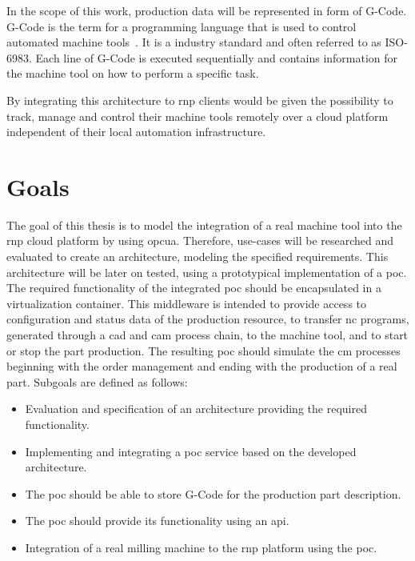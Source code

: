 \documentclass[
a4paper,
twoside,
headsepline,
cleardoublepage=empty,
parskip=half,
draft=false
]{scrbook}
\begin{document}
			In the scope of this work, production data will be represented in form of G-Code.
			G-Code is the term for a programming language that is used to control automated machine tools~\cite{shin2007reincarnation}. 
			It is a industry standard and often referred to as ISO-6983. 
			Each line of G-Code is executed sequentially and contains information for the machine tool on how to perform a specific task.
			
			By integrating this architecture to \gls{rnp} clients would be given the possibility to track, manage and control their machine tools remotely over a cloud platform independent of their local automation infrastructure.
		
		\section{Goals}\label{sec:goals}
			
			The goal of this thesis is to model the integration of a real machine tool into the \gls{rnp} cloud platform by using \gls{opcua}.
			Therefore, use-cases will be researched and evaluated to create an architecture, modeling the specified requirements.
			This architecture will be later on tested, using a prototypical implementation of a \gls{poc}. 
			The required functionality of the integrated \gls{poc} should be encapsulated in a virtualization container. 
			This middleware is intended to provide access to configuration and status data of the production resource, to transfer \gls{nc} programs, generated through a \gls{cad} and \gls{cam} process chain, to the machine tool, and to start or stop the part production. The resulting \gls{poc} should simulate the \gls{cm} processes beginning with the order management and ending with the production of a real part.
			Subgoals are defined as follows:
			
			\begin{itemize}
				
				\item Evaluation and specification of an architecture providing the required functionality.
				
				\item Implementing and integrating a \gls{poc} service based on the developed architecture.
				
				\item The \gls{poc} should be able to store G-Code for the production part description.
				
				\item The \gls{poc} should provide its functionality using  an \gls{api}.
				
				\item Integration of a real milling machine to the \gls{rnp} platform using the \gls{poc}.
				
			\end{itemize}
			
\end{document}
